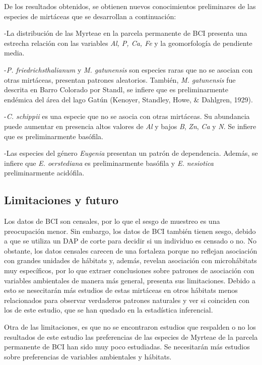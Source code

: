 \documentclass[11pt,]{article}
\begin{document}
De los resultados obtenidos, se obtienen nuevos conocimientos
preliminares de las especies de mirtáceas que se desarrollan a
continuación:

-La distribución de las Myrteae en la parcela permanente de BCI presenta
una estrecha relación con las variables \emph{Al, P, Ca, Fe} y la
geomorfología de pendiente media.

-\emph{P. friedrichsthalianum} y \emph{M. gatunensis} son especies raras
que no se asocian con otras mirtáceas, presentan patrones aleatorios.
También, \emph{M. gatunensis} fue descrita en Barro Colorado por Standl,
se infiere que es preliminarmente endémica del área del lago Gatún
(Kenoyer, Standley, Howe, \& Dahlgren, 1929).

-\emph{C. schippii} es una especie que no se asocia con otras mirtáceas.
Su abundancia puede aumentar en presencia altos valores de \emph{Al} y
bajos \emph{B}, \emph{Zn}, \emph{Ca} y \emph{N}. Se infiere que es
preliminarmente basófila.

-Las especies del género \emph{Eugenia} presentan un patrón de
dependencia. Además, se infiere que \emph{E. oerstediana} es
preliminarmente basófila y \emph{E. nesiotica} preliminarmente
acidófila.

\subsection{Limitaciones y futuro}\label{limitaciones-y-futuro}

Los datos de BCI son censales, por lo que el sesgo de muestreo es una
preocupación menor. Sin embargo, los datos de BCI también tienen sesgo,
debido a que se utiliza un DAP de corte para decidir si un individuo es
censado o no. No obstante, los datos censales carecen de una fortaleza
porque no reflejan asociación con grandes unidades de hábitats y,
además, revelan asociación con microhábitats muy específicos, por lo que
extraer conclusiones sobre patrones de asociación con variables
ambientales de manera más general, presenta sus limitaciones. Debido a
esto se nesecitarán más estudios de estas mirtáceas en otros hábitats
menos relacionados para observar verdaderos patrones naturales y ver si
coinciden con los de este estudio, que se han quedado en la estadística
inferencial.

Otra de las limitaciones, es que no se encontraron estudios que
respalden o no los resultados de este estudio las preferencias de las
especies de Myrteae de la parcela permanente de BCI han sido muy poco
estudiadas. Se necesitarán más estudios sobre preferencias de variables
ambientales y hábitats.
\end{document}
